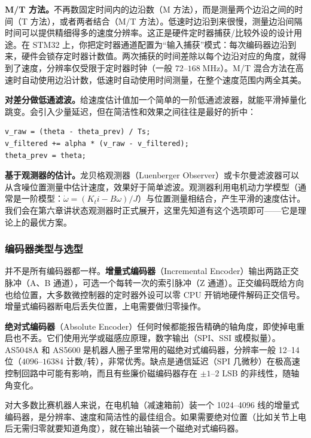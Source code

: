 \textbf{M/T 方法。}不再数固定时间内的边沿数（M 方法），而是测量两个边沿之间的时间（T 方法），或者两者结合（M/T 方法）。低速时边沿到来很慢，测量边沿间隔时间可以提供精细得多的速度分辨率。这正是硬件定时器捕获/比较外设的设计用途。在 STM32 上，你把定时器通道配置为``输入捕获''模式：每次编码器边沿到来，硬件会锁存定时器计数值。两次捕获的时间差除以每个边沿对应的角度，就得到了速度，分辨率仅受限于定时器时钟（一般 $72$--$168\;\mathrm{MHz}$）。M/T 混合方法在高速时自动使用边沿计数，低速时自动使用时间测量，在整个速度范围内两全其美。

\textbf{对差分做低通滤波。}给速度估计值加一个简单的一阶低通滤波器，就能平滑掉量化跳变。会引入少量延迟，但在简洁性和效果之间往往是最好的折中：

\begin{verbatim}
v_raw = (theta - theta_prev) / Ts;
v_filtered += alpha * (v_raw - v_filtered);
theta_prev = theta;
\end{verbatim}

\textbf{基于观测器的估计。}龙贝格观测器（Luenberger Observer）或卡尔曼滤波器可以从含噪位置测量中估计速度，效果好于简单滤波。观测器利用电机动力学模型（通常是一阶模型：$\dot{\omega} = (K_t i - B\omega) / J$）与位置测量相结合，产生平滑的速度估计。我们会在第六章讲状态观测器时正式展开，这里先知道有这个选项即可——它是理论上的最优方案。

\subsubsection{编码器类型与选型}

并不是所有编码器都一样。\textbf{增量式编码器}（Incremental Encoder）输出两路正交脉冲（A、B 通道），可选一个每转一次的索引脉冲（Z 通道）。正交编码既给方向也给位置，大多数微控制器的定时器外设可以零 CPU 开销地硬件解码正交信号。增量式编码器断电后丢失位置，上电需要做归零操作。

\textbf{绝对式编码器}（Absolute Encoder）任何时候都能报告精确的轴角度，即使掉电重启也不丢。它们使用光学或磁感应原理，数字输出（SPI、SSI 或模拟量）。AS5048A 和 AS5600 是机器人圈子里常用的磁绝对式编码器，分辨率一般 12--14 位（$4096$--$16384$ 计数/转），非常优秀。缺点是通信延迟（SPI 几微秒）在极高速控制回路中可能有影响，而且有些廉价磁编码器存在 $\pm 1$--$2$ LSB 的非线性，随轴角变化。

对大多数比赛机器人来说，在电机轴（减速箱前）装一个 1024--4096 线的增量式编码器，是分辨率、速度和简洁性的最佳组合。如果需要绝对位置（比如关节上电后无需归零就要知道角度），就在输出轴装一个磁绝对式编码器。

